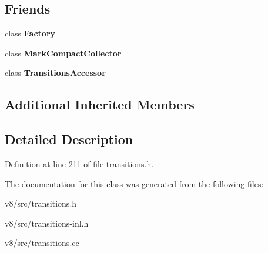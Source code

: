 \subsection*{Friends}
\begin{DoxyCompactItemize}
\item 
\mbox{\label{classv8_1_1internal_1_1TransitionArray_a328c093d609680cca505905c6d49901a}} 
class {\bfseries Factory}
\item 
\mbox{\label{classv8_1_1internal_1_1TransitionArray_ae585a96455613b2bc2ae3ea75a061d8b}} 
class {\bfseries Mark\+Compact\+Collector}
\item 
\mbox{\label{classv8_1_1internal_1_1TransitionArray_a3dd513671ceddc2f842cb61a35133c58}} 
class {\bfseries Transitions\+Accessor}
\end{DoxyCompactItemize}
\subsection*{Additional Inherited Members}


\subsection{Detailed Description}


Definition at line 211 of file transitions.\+h.



The documentation for this class was generated from the following files\+:\begin{DoxyCompactItemize}
\item 
v8/src/transitions.\+h\item 
v8/src/transitions-\/inl.\+h\item 
v8/src/transitions.\+cc\end{DoxyCompactItemize}
